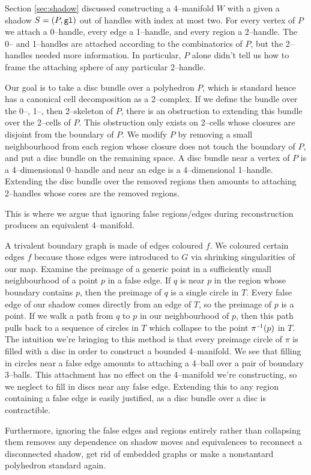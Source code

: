 Section \ref{sec:shadow} discussed constructing a 4--manifold $W$ with a given a shadow $S=(P,\texttt{gl})$ out of handles with index at most two.
For every vertex of $P$ we attach a 0--handle, every edge a 1--handle, and every region a 2--handle.
The 0-- and 1--handles are attached according to the combinatorics of $P$, but the 2--handles needed more information.
In particular, $P$ alone didn't tell us how to frame the attaching sphere of any particular 2--handle.

Our goal is to take a disc bundle over a polyhedron $P$, which is standard hence has a canonical cell decomposition as a 2--complex.
If we define the bundle over the 0--, 1--, then 2--skeleton of $P$, there is an obstruction to extending this bundle over the 2--cells of $P$.
This obstruction only exists on 2--cells whose closures are disjoint from the boundary of $P$.
We modify $P$ by removing a small neighbourhood from each region whose closure does not touch the boundary of $P$, and put a disc bundle on the remaining space.
A disc bundle near a vertex of $P$ is a 4--dimensional 0--handle and near an edge is a 4--dimensional 1--handle.
Extending the disc bundle over the removed regions then amounts to attaching 2--handles whose cores are the removed regions.

This is where we argue that ignoring false regions/edges during reconstruction produces an equivalent 4--manifold.

A trivalent boundary graph is made of edges coloured $f$.
We coloured certain edges $f$ because those edges were introduced to $G$ via shrinking singularities of our map.
Examine the preimage of a generic point in a sufficiently small neighbourhood of a point $p$ in a false edge.
If $q$ is near $p$ in the region whose boundary contains $p$, then the preimage of $q$ is a single circle in $T$.
Every false edge of our shadow comes directly from an edge of $T$, so the preimage of $p$ is a point.
If we walk a path from $q$ to $p$ in our neighbourhood of $p$, then this path pulls back to a sequence of circles in $T$ which collapse to the point $\pi^{\,\text{-}1}(p)$ in $T$.
The intuition we're bringing to this method is that every preimage circle of $\pi$ is filled with a disc in order to construct a bounded 4--manifold.
We see that filling in circles near a false edge amounts to attaching a 4--ball over a pair of boundary 3--balls.
This attachment has no effect on the 4--manifold we're constructing, so we neglect to fill in discs near any false edge.
Extending this to any region containing a false edge is easily justified, as a disc bundle over a disc is contractible.

Furthermore, ignoring the false edges and regions entirely rather than collapsing them removes any dependence on shadow moves and equivalences to reconnect a disconnected shadow, get rid of embedded graphs or make a nonstantard polyhedron standard again.
